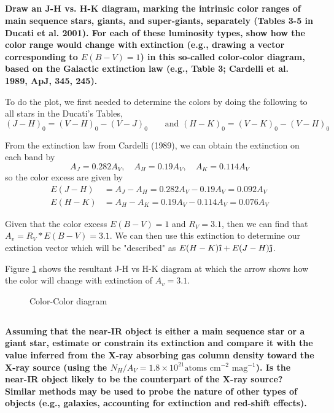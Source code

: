 \subsection{}
\textbf{Draw an J-H vs. H-K diagram, marking the intrinsic color ranges of main sequence stars, giants, and super-giants, separately (Tables 3-5 in Ducati et al. 2001).
For each of these luminosity types, show how the color range would change with extinction (e.g., drawing a vector corresponding to $E(B-V)=1$) in this so-called color-color diagram, based on the Galactic extinction law (e.g., Table 3; Cardelli et al. 1989, ApJ, 345, 245).}

To do the plot, we first needed to determine the colors by doing the following to all stars in the Ducati's Tables,
\begin{equation*}
    (J-H)_0 = (V-H)_0 - (V-J)_0\qquad\text{and }
    (H-K)_0 = (V-K)_0 - (V-H)_0
\end{equation*}

From the extinction law from Cardelli (1989), we can obtain the extinction on each band by
\begin{equation*}
    A_J = 0.282A_V,\quad A_H = 0.19A_V,\quad A_K = 0.114A_V
\end{equation*}
so the color excess are given by
\begin{align*}
    E(J-H) &= A_J - A_H = 0.282A_V - 0.19A_V = 0.092A_V\\
    E(H-K) &= A_H - A_K = 0.19A_V - 0.114A_V = 0.076A_V
\end{align*}

Given that the color excess $E(B-V)=1$ and $R_V=3.1$, then we can find that $A_v = R_V * E(B-V) = 3.1$. 
We can then use this extinction to determine our extinction vector which will be "described" as $E(H-K)\uveci + E(J-H)\uvecj$.

Figure \ref{fig:ColorColorDiagram} shows the resultant J-H vs H-K diagram at which the arrow shows how the color will change with extinction of $A_v=3.1$. 

\begin{figure}
    \centering
    
    \caption{Color-Color diagram}
    \label{fig:ColorColorDiagram}
\end{figure}

\subsection{}
\textbf{Assuming that the near-IR object is either a main sequence star or a giant star, estimate or constrain its extinction and compare it with the value inferred from the X-ray absorbing gas column density toward the X-ray source (using the $N_H/A_V = 1.8\times 10^{21} \text{atoms cm}^{-2} \text{ mag}^{-1}$).
Is the near-IR object likely to be the counterpart of the X-ray source?
Similar methods may be used to probe the nature of other types of objects (e.g., galaxies, accounting for extinction and red-shift effects).}

